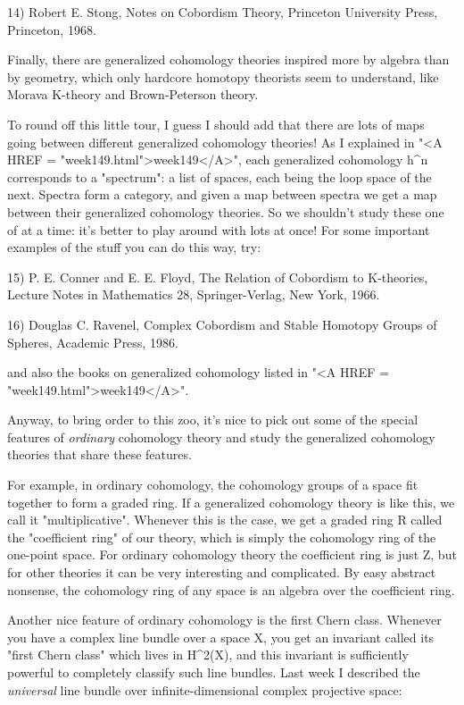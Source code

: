 14) Robert E. Stong, Notes on Cobordism Theory, Princeton University
Press, Princeton, 1968.

Finally, there are generalized cohomology theories inspired more by
algebra than by geometry, which only hardcore homotopy theorists seem to
understand, like Morava K-theory and Brown-Peterson theory.

To round off this little tour, I guess I should add that there are lots
of maps going between different generalized cohomology theories!  As I
explained in "<A HREF = "week149.html">week149</A>", each generalized cohomology h^{n} corresponds to a
"spectrum": a list of spaces, each being the loop space of the next. 
Spectra form a category, and given a map between spectra we get a map
between their generalized cohomology theories.  So we shouldn't study
these one of at a time: it's better to play around with lots at once! 
For some important examples of the stuff you can do this way, try:

15) P. E. Conner and E. E. Floyd, The Relation of Cobordism to K-theories,
Lecture Notes in Mathematics 28, Springer-Verlag, New York, 1966.
     
16) Douglas C. Ravenel, Complex Cobordism and Stable Homotopy Groups 
of Spheres, Academic Press, 1986.

and also the books on generalized cohomology listed in "<A HREF = "week149.html">week149</A>".        

Anyway, to bring order to this zoo, it's nice to pick out some of the
special features of \emph{ordinary} cohomology theory and study the 
generalized cohomology theories that share these features.  

For example, in ordinary cohomology, the cohomology groups of a space
fit together to form a graded ring.  If a generalized cohomology theory
is like this, we call it "multiplicative".   Whenever this is the case,
we get a graded ring R called the "coefficient ring" of our theory,
which is simply the cohomology ring of the one-point space. 
For ordinary cohomology theory the coefficient ring is just
Z, but for other theories it can be very interesting and complicated.
By easy
abstract nonsense,  the cohomology ring of any space is an algebra over
the coefficient ring.  

Another nice feature of ordinary cohomology is the first Chern class.
Whenever you have a complex line bundle over a space X, you get an
invariant called its "first Chern class" which lives in
H^{2}(X), and this invariant is sufficiently powerful to
completely classify such line bundles.  Last week I described the
\emph{universal} line bundle over infinite-dimensional complex
projective space:

